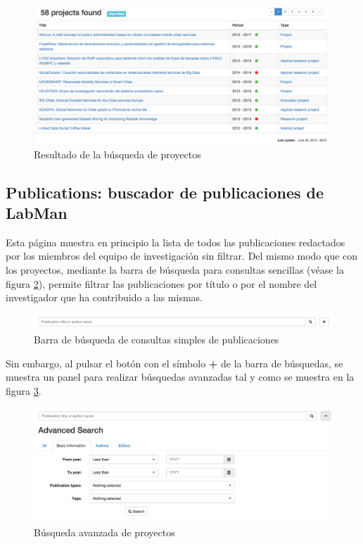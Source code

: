 \begin{figure}[!htbp]
	\centering
	\includegraphics[scale=0.31]{fig/projects_search_result}
	\caption{Resultado de la búsqueda de proyectos}
	\label{fig:projects_search_result}
\end{figure}

\subsection{Publications: buscador de publicaciones de LabMan}

Esta página muestra en principio la lista de todos las publicaciones redactados por los miembros del equipo de investigación sin filtrar. Del mismo modo que con los proyectos, mediante la barra de búsqueda para consultas sencillas (véase la figura \ref{fig:publication_search_bar}), permite filtrar las publicaciones por título o por el nombre del investigador que ha contribuido a las mismas.

\begin{figure}[!htbp]
	\centering
	\includegraphics[scale=0.35]{fig/publication_search_bar}
	\caption{Barra de búsqueda de consultas simples de publicaciones}
	\label{fig:publication_search_bar}
\end{figure}

Sin embargo, al pulsar el botón con el símbolo \textbf{+} de la barra de búsquedas, se muestra un panel para realizar búsquedas avanzadas tal y como se muestra en la figura \ref{fig:publications_advanced_search}.

\begin{figure}[!htbp]
	\centering
	\includegraphics[scale=0.7]{fig/publications_advanced_search}
	\caption{Búsqueda avanzada de proyectos}
	\label{fig:publications_advanced_search}
\end{figure}


